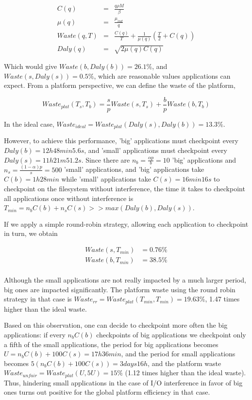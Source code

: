 \documentclass{article}
\begin{document}
\begin{eqnarray}
C(q) &=& \frac{q\rho M}{\beta}\\
\mu(q) &=& \frac{\mu_{ind}}{q}\\
Waste(q, T) &=& \frac{C(q)}{T} + \frac{1}{\mu(q)}\left(\frac{T}{2}+C(q)\right)\\
Daly(q) &=& \sqrt{2\mu(q)C(q)}
\end{eqnarray}

Which would give $Waste(b, Daly(b)) = 26.1\%$, and $Waste(s, Daly(s)) = 0.5\%$, which are reasonable values applications can expect. From a platform perspective, we can define the waste of the platform, 

$$Waste_{plat}(T_s, T_b) = \frac{s}{p}Waste(s, T_s) + \frac{b}{p}Waste(b, T_b)$$

In the ideal case, $Waste_{ideal} = Waste_{plat}(Daly(s), Daly(b)) = 13.3\%$.

However, to achieve this performance, 'big' applications must checkpoint every $Daly(b) = 12h48min5.6s$, and 'small' applications must checkpoint every $Daly(s) = 11h21m51.2s$. Since there are $n_b = \frac{\alpha p}{b} = 10$ 'big' applications and $n_s = \frac{(1-\alpha)p}{s} = 500$ 'small' applications, and 'big' applications take $C(b) = 1h28min$ while 'small' applications take $C(s) = 16min16s$ to checkpoint on the filesystem without interference, the time it takes to checkpoint all applications once without interference is $T_{min} = n_bC(b) + n_sC(s) >> max(Daly(b), Daly(s))$.

If we apply a simple round-robin strategy, allowing each application to checkpoint in turn, we obtain

$$
\begin{array}{rl}
Waste(s, T_{min}) &= 0.76\%\\
Waste(b, T_{min}) &= 38.5\%\\
\end{array}
$$

Although the small applications are not really impacted by a much larger period, big ones are impacted significantly. The platform waste using the round robin strategy in that case is $Waste_{rr} = Waste_{plat}(T_{min}, T_{min}) = 19.63\%$, 1.47 times higher than the ideal waste.

Based on this observation, one can decide to checkpoint more often the big applications: if every $n_bC(b)$ checkpoints of big applications we checkpoint only a fifth of the small applications, the period for big applications becomes $U = n_bC(b)+100C(s) = 17h36min$, and the period for small applications becomes $5(n_bC(b)+100C(s)) = 3 days 16h$, and the platform waste $Waste_{unfair} = Waste_{plat}(U, 5U) = 15\%$ (1.12 times higher than the ideal waste). Thus, hindering small applications in the case of I/O interference in favor of big ones turns out positive for the global platform efficiency in that case.
\end{document}
